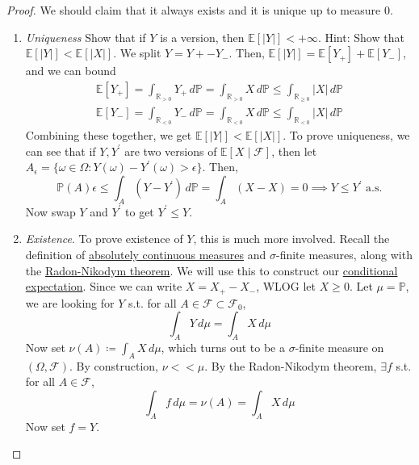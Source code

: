 	\begin{proof}
		We should claim that it always exists and it is unique up to measure $0$. 
		\begin{enumerate}
			\item \textit{Uniqueness} Show that if $Y$ is a version, then $\mathbb{E}[|Y|] < +\infty$. Hint: Show that $\mathbb{E}[|Y|] < \mathbb{E}[|X|]$. We split $Y = Y+ - Y_{-}$. Then, $\mathbb{E}[|Y|] = \mathbb{E}[Y_+] + \mathbb{E}[Y_-]$, and we can bound 
				\begin{align}
					\mathbb{E}[Y_+] = \int_{\mathbb{R}_{>0}} Y_+ \,d\mathbb{P} = \int_{\mathbb{R}_{>0}} X \,d\mathbb{P} \leq \int_{\mathbb{R}_{\geq 0}} |X| \,d\mathbb{P} \\ 
					\mathbb{E}[Y_-] = \int_{\mathbb{R}_{<0}} Y_- \,d\mathbb{P} = \int_{\mathbb{R}_{<0}} X \,d\mathbb{P} \leq \int_{\mathbb{R}_{< 0}} |X| \,d\mathbb{P} 
				\end{align}
				Combining these together, we get $\mathbb{E}[|Y|] < \mathbb{E}[|X|]$. To prove uniqueness, we can see that if $Y, Y^\prime$ are two versions of $\mathbb{E}[X \mid \mathcal{F}]$, then let $A_\epsilon = \{\omega \in \Omega \colon Y(\omega) - Y^\prime (\omega) > \epsilon \}$. Then, 
				\begin{equation}
					\mathbb{P}(A) \epsilon \leq \int_A (Y - Y^\prime) \,d\mathbb{P} = \int_A (X - X) = 0 \implies Y \leq Y^\prime \text{ a.s.}
				\end{equation}
				Now swap $Y$ and $Y^\prime$ to get $Y^\prime \leq Y$. 
			\item \textit{Existence}. To prove existence of $Y$, this is much more involved. Recall the definition of \hyperref[mt-def:absolutely-continuous-measures]{absolutely continuous measures} and $\sigma$-finite measures, along with the \hyperref[mt-thm:rn-der]{Radon-Nikodym theorem}. We will use this to construct our \hyperref[def:cond-exp]{conditional expectation}. Since we can write $X = X_+ - X_-$, WLOG let $X \geq 0$. Let $\mu = \mathbb{P}$, we are looking for $Y$ s.t. for all $A \in \mathcal{F} \subset \mathcal{F}_0$, 
				\begin{equation}
				  \int_A Y \,d\mu = \int_A X \,d\mu
				\end{equation}
				Now set $\nu(A) \coloneqq \int_A X \,d\mu$, which turns out to be a $\sigma$-finite measure on $(\Omega, \mathcal{F})$. By construction, $\nu << \mu$. By the Radon-Nikodym theorem, $\exists f$ s.t. for all $A \in \mathcal{F}$, 
				\begin{equation}
				  \int_A f \,d\mu = \nu(A) = \int_A X \,d\mu
				\end{equation}
				Now set $f = Y$. 
		\end{enumerate}
	\end{proof}

